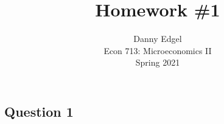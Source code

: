 \documentclass{article}
\begin{document}
\title{	Homework \#1 }
\author{ 	Danny Edgel 					\\ 
			Econ 713: Microeconomics II		\\
			Spring 2021						\\
		}
\maketitle\thispagestyle{empty}



\subsection*{Question 1}
\end{document}
